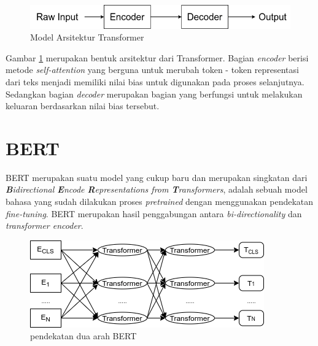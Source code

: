 \begin{figure}[h!]
    \centering
    \includegraphics[width=\textwidth]{gambar/transformer_architecture.png}
    \caption{Model Arsitektur Transformer}
    \label{fig: architecture_transformer}
\end{figure}

Gambar \ref{fig: architecture_transformer} merupakan bentuk arsitektur dari Transformer. Bagian \textit{encoder} berisi metode \textit{self-attention} yang berguna untuk merubah token - token representasi dari teks menjadi memiliki nilai bias untuk digunakan pada proses selanjutnya. Sedangkan bagian \textit{decoder} merupakan bagian yang berfungsi untuk melakukan keluaran berdasarkan nilai bias tersebut.

\section{BERT}
BERT merupakan suatu model yang cukup baru dan merupakan singkatan dari \textit{\textbf{B}idirectional \textbf{E}ncode \textbf{R}epresentations from \textbf{T}ransformers}, adalah sebuah model bahasa yang sudah dilakukan proses \textit{pretrained} dengan menggunakan pendekatan \textit{fine-tuning}. BERT merupakan hasil penggabungan antara \textit{bi-directionality} dan \textit{transformer encoder}. \cite{devlin2019bert}

\begin{figure}[h]
    \begin{center}
        \includegraphics[width= .8\linewidth]{gambar/bert_archi_base.png}
        \caption{pendekatan dua arah BERT}
        \label{fig: bidirectionalBert}
    \end{center}
\end{figure}

